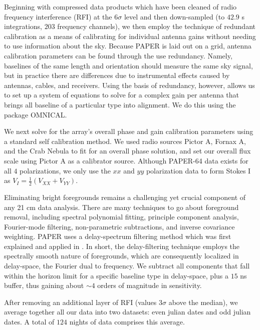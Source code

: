 \documentclass[preprint2,numberedappendix,tighten,twocolappendix]{aastex6}  %
\begin{document}
Beginning with compressed data products which have been cleaned of radio frequency interference (RFI) at the $6\sigma$ level and then down-sampled (to $42.9$ s integrations, $203$ frequency channels), we then employ the technique of redundant calibration as a means of calibrating for individual antenna gains without needing to use information about the sky. Because PAPER is laid out on a grid, antenna calibration parameters can be found through the use redundancy. Namely, baselines of the same length and orientation should measure the same sky signal, but in practice there are differences due to instrumental effects caused by antennas, cables, and receivers. Using the basis of redundancy, however, allows us to set up a system of equations to solve for a complex gain per antenna that brings all baseline of a particular type into alignment. We do this using the package OMNICAL.

We next solve for the array's overall phase and gain calibration parameters using a standard self calibration method. We used radio sources Pictor A, Fornax A, and the Crab Nebula to fit for an overall phase solution, and set our overall flux scale using Pictor A as a calibrator source. Although PAPER-64 data exists for all $4$ polarizations, we only use the $xx$ and $yy$ polarization data to form Stokes I as $V_{I} = \frac{1}{2}(V_{XX} + V_{YY})$.

Eliminating bright foregrounds remains a challenging yet crucial component of any 21 cm data analysis. There are many techniques to go about foreground removal, including spectral polynomial fitting, principle component analysis, Fourier-mode filtering, non-parametric subtractions, and inverse covariance weighting. PAPER uses a delay-spectrum filtering method which was first explained and applied in \citet{parsons_et_al2014}. In short, the delay-filtering technique employs the spectrally smooth nature of foregrounds, which are consequently localized in delay-space, the Fourier dual to frequency. We subtract all components that fall within the horizon limit for a specific baseline type in delay-space, plus a $15$ ns buffer, thus gaining about $\sim4$ orders of magnitude in sensitivity. 

After removing an additional layer of RFI (values $3\sigma$ above the median), we average together all our data into two datasets: even julian dates and odd julian dates. A total of $124$ nights of data comprises this average.
\end{document}
